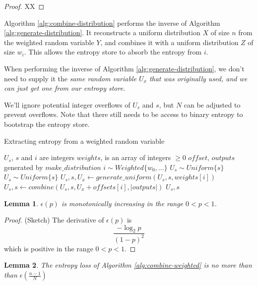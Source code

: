 \documentclass[12pt]{article}
\newtheorem{lemma}{Lemma}
\begin{document}
\begin{proof}
    XX
\end{proof}

Algorithm \ref{alg:combine-distribution} performs the inverse of Algorithm \ref{alg:generate-distribution}. It reconstructs a uniform distribution $X$ of size $n$ from the weighted random variable $Y$, and combines it with a uniform distribution $Z$ of size $w_i$. This allows the entropy store to absorb the entropy from $i$.

When performing the inverse of Algorithm \ref{alg:generate-distribution}, we don't need to supply it the \em same \em random variable $U_x$ that was originally used, and we can just get one from our entropy store.

We'll ignore potential integer overflows of $U_s$ and $s$, but $N$ can be adjusted to prevent overflows. Note that there still needs to be access to binary entropy to bootstrap the entropy store.

\begin{algorithm}
\caption{Extracting entropy from a weighted random variable}
\label{alg:combine-weighted}
\begin{algorithmic}[1]
\Require $U_s$, $s$ and $i$ are integers
\Require $weights$, is an array of integers $\ge 0$
\Require $offset$, $outputs$ generated by $make\_distribution$ 
\Require $i \sim Weighted\{w_0, ...\}$
\Require $U_s \sim Uniform\{s\}$
\Ensure $U_s \sim Uniform\{s\}$
    \State $U_s, s, U_x \gets generate\_uniform(U_s, s, weights[i])$
    \State $U_s, s \gets combine(U_s, s, U_x + offsets[i], |outputs|)$
    \State \Return $U_s, s$
\EndProcedure
\end{algorithmic}
\end{algorithm}

\begin{lemma}
    \label{lem:hloss_monotonic}
    $\epsilon(p)$ is monotonically increasing in the range $0 < p < 1$.
\end{lemma}

\begin{proof}(Sketch) The derivative of $\epsilon(p)$ is
    \begin{equation}
        \frac{-\log_2p}{(1-p)^2}
    \end{equation}
    which is positive in the range $0 < p < 1$.
\end{proof}

\begin{lemma}
The entropy loss of Algorithm \ref{alg:combine-weighted} is no more than than $\epsilon(\frac{n-1}{N})$
\end{lemma}
\end{document}
